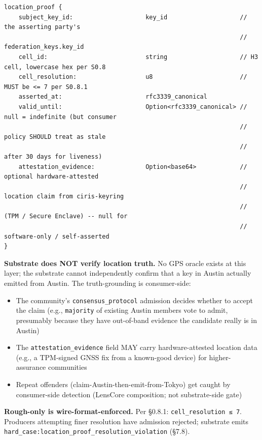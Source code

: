 \documentclass[10pt]{article}
\begin{document}
\begin{lstlisting}
location_proof {
    subject_key_id:                    key_id                    // the asserting party's
                                                                 //   federation_keys.key_id
    cell_id:                           string                    // H3 cell, lowercase hex per S0.8
    cell_resolution:                   u8                        // MUST be <= 7 per S0.8.1
    asserted_at:                       rfc3339_canonical
    valid_until:                       Option<rfc3339_canonical> // null = indefinite (but consumer
                                                                 //   policy SHOULD treat as stale
                                                                 //   after 30 days for liveness)
    attestation_evidence:              Option<base64>            // optional hardware-attested
                                                                 //   location claim from ciris-keyring
                                                                 //   (TPM / Secure Enclave) -- null for
                                                                 //   software-only / self-asserted
}
\end{lstlisting}

\textbf{Substrate does NOT verify location truth.} No GPS oracle exists at this layer; the substrate cannot independently confirm that a key in Austin actually emitted from Austin. The truth-grounding is consumer-side:


\begin{itemize}\setlength\itemsep{0pt}
\item The community's \texttt{consensus\_protocol} admission decides whether to accept the claim (e.g., \texttt{majority} of existing Austin members vote to admit, presumably because they have out-of-band evidence the candidate really is in Austin)
\item The \texttt{attestation\_evidence} field MAY carry hardware-attested location data (e.g., a TPM-signed GNSS fix from a known-good device) for higher-assurance communities
\item Repeat offenders (claim-Austin-then-emit-from-Tokyo) get caught by consumer-side detection (LensCore composition; not substrate-side gate)
\end{itemize}


\textbf{Rough-only is wire-format-enforced.} Per §0.8.1: \texttt{cell\_resolution ≤ 7}. Producers attempting finer resolution have admission rejected; substrate emits \texttt{hard\_case:location\_proof\_resolution\_violation} (§7.8).
\end{document}
